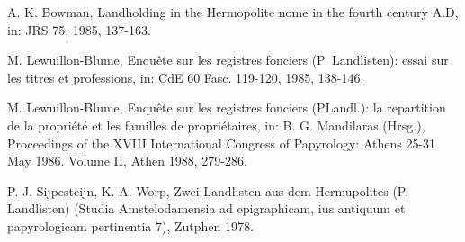 \documentclass[
]{article}
\begin{document}
A. K. Bowman, Landholding in the Hermopolite nome in the fourth century
A.D, in: JRS 75, 1985, 137-163.

M. Lewuillon-Blume, Enquête sur les registres fonciers (P. Landlisten):
essai sur les titres et professions, in: CdE 60 Fasc. 119-120, 1985,
138-146.

M. Lewuillon-Blume, Enquête sur les registres fonciers (PLandl.): la
repartition de la propriété et les familles de propriétaires, in: B. G.
Mandilaras (Hrsg.), Proceedings of the XVIII International Congress of
Papyrology: Athens 25-31 May 1986. Volume II, Athen 1988, 279-286.

P. J. Sijpesteijn, K. A. Worp, Zwei Landlisten aus dem Hermupolites (P.
Landlisten) (Studia Amstelodamensia ad epigraphicam, ius antiquum et
papyrologicam pertinentia 7), Zutphen 1978.
\end{document}
